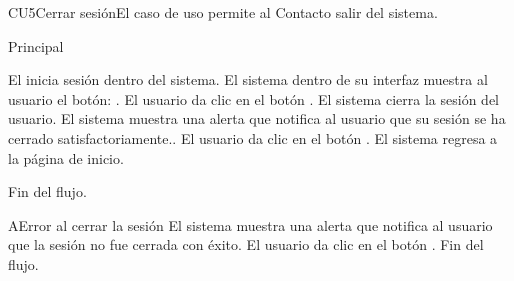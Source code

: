 
% 



	\begin{UseCase}{CU5}{Cerrar sesi\'on}{El caso de uso permite al Contacto salir del sistema.
	}
	\end{UseCase}

	\begin{UCtrayectoria}{Principal}
	
		\UCpaso[\UCactor] El inicia sesi\'on dentro del sistema.
		\UCpaso  El sistema dentro de su interfaz muestra al usuario el bot\'on: .
		\UCpaso[\UCactor] El usuario da clic en el bot\'on .
		\UCpaso  El sistema cierra la sesi\'on del usuario.
		\UCpaso  El sistema muestra una alerta que notifica al usuario que su sesi\'on se ha cerrado satisfactoriamente..
		\UCpaso[\UCactor] El usuario da clic en el bot\'on .
		\UCpaso  El sistema regresa a la p\'agina de inicio.
	
		\UCpaso[] Fin del flujo.
				
	\end{UCtrayectoria}
		
		\begin{UCtrayectoriaA}{A}{Error al cerrar la sesi\'on}
			\UCpaso El sistema muestra una alerta que notifica al usuario que la sesi\'on no fue cerrada con \'exito.
			\UCpaso[\UCactor] El usuario da clic en el bot\'on . 			
			\UCpaso[] Fin del flujo.
		\end{UCtrayectoriaA}

		
		
				
